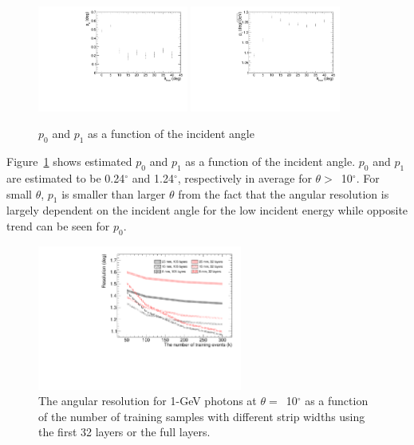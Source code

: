 \documentclass[preprint,12pt,times,a4paper]{elsarticle}
\begin{document}
\begin{figure}[!hbt]
\centering
\includegraphics[width=0.44\textwidth]{figures/Fig7_p0.pdf}
\includegraphics[width=0.44\textwidth]{figures/Fig7_p1.pdf}
\caption{ $p_{0}$ and $p_{1}$ as a function of the incident angle }
\label{fig:res_edep}
\end{figure}

Figure~\ref{fig:res_edep} shows estimated $p_{0}$ and $p_{1}$ as a function of the incident angle. $p_{0}$ and $p_{1}$ are estimated to be 0.24$^{\circ}$ and 1.24$^{\circ}$, respectively in average for $\theta>$~10$^{\circ}$. For small $\theta$, $p_{1}$ is smaller than larger $\theta$ from the fact that the angular resolution is largely dependent on the incident angle for the low incident energy while opposite trend can be seen for $p_{0}$.

\begin{figure}[!hbt]
\centering
\includegraphics[width=0.6\textwidth]{figures/Fig8_nsample.pdf}
\caption{ The angular resolution for 1-GeV photons at $\theta=$~10$^{\circ}$ as a function of the number of training samples with different strip widths using the first 32 layers or the full layers. }
\label{fig:multi-parameter}
\end{figure}
\end{document}
